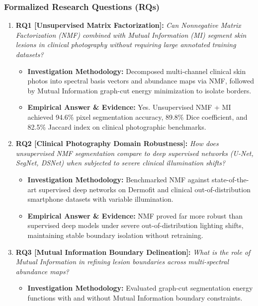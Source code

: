 \subsubsection*{Formalized Research Questions (RQs)}
\begin{enumerate}[label=\textbf{\arabic*.}, leftmargin=*]
  \item \textbf{RQ1 [Unsupervised Matrix Factorization]:} \textit{Can Nonnegative Matrix Factorization (NMF) combined with Mutual Information (MI) segment skin lesions in clinical photography without requiring large annotated training datasets?}
  \begin{itemize}[leftmargin=1.5em]
    \item \textbf{Investigation Methodology:} Decomposed multi-channel clinical skin photos into spectral basis vectors and abundance maps via NMF, followed by Mutual Information graph-cut energy minimization to isolate borders.
    \item \textbf{Empirical Answer \& Evidence:} Yes. Unsupervised NMF + MI achieved 94.6\% pixel segmentation accuracy, 89.8\% Dice coefficient, and 82.5\% Jaccard index on clinical photographic benchmarks.
  \end{itemize}
  \item \textbf{RQ2 [Clinical Photography Domain Robustness]:} \textit{How does unsupervised NMF segmentation compare to deep supervised networks (U-Net, SegNet, DSNet) when subjected to severe clinical illumination shifts?}
  \begin{itemize}[leftmargin=1.5em]
    \item \textbf{Investigation Methodology:} Benchmarked NMF against state-of-the-art supervised deep networks on Dermofit and clinical out-of-distribution smartphone datasets with variable illumination.
    \item \textbf{Empirical Answer \& Evidence:} NMF proved far more robust than supervised deep models under severe out-of-distribution lighting shifts, maintaining stable boundary isolation without retraining.
  \end{itemize}
  \item \textbf{RQ3 [Mutual Information Boundary Delineation]:} \textit{What is the role of Mutual Information in refining lesion boundaries across multi-spectral abundance maps?}
  \begin{itemize}[leftmargin=1.5em]
    \item \textbf{Investigation Methodology:} Evaluated graph-cut segmentation energy functions with and without Mutual Information boundary constraints.

\end{itemize}
\end{enumerate}

